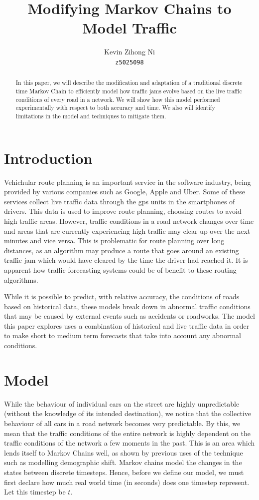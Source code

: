 \documentclass[a4paper]{article}
\title{Modifying Markov Chains to Model Traffic}
\author{Kevin Zihong Ni\\\texttt{z5025098}}
\begin{document}
\maketitle

\begin{abstract}
	In this paper, we will describe the modification and adaptation of a traditional discrete time Markov Chain to efficiently model how 
	traffic jams evolve based on the live traffic conditions of every road in a network.
	We will show how this model performed experimentally with respect to both accuracy and time.
	We also will identify limitations in the model and techniques to mitigate them.
\end{abstract}

\section{Introduction}
Vehichular route planning is an important service in the software industry, being provided by various companies such as Google, Apple and Uber.
Some of these services collect live traffic data through the gps units in the smartphones of drivers.
This data is used to improve route planning, choosing routes to avoid high traffic areas.
However, traffic conditions in a road network changes over time and areas that are currently experiencing high traffic may clear up over the next minutes and vice versa.
This is problematic for route planning over long distances, 
as an algorithm may produce a route that goes around an existing traffic jam which would have cleared by the time the driver had reached it.  
It is apparent how traffic forecasting systems could be of benefit to these routing algorithms.

While it is possible to predict, with relative accuracy, the conditions of roads based on historical data, 
these models break down in abnormal traffic conditions that may be caused by external events such as accidents or roadworks.
The model this paper explores uses a combination of historical and live traffic data in order to make short to medium term forecasts that take into account any 
abnormal conditions. 

\section{Model}
While the behaviour of individual cars on the street are highly unpredictable (without the knowledge of its intended destination), we notice that the collective behaviour 
of all cars in a road network becomes very predictable.
By this, we mean that the traffic conditions of the entire network is highly dependent on the traffic conditions of the network a few moments in the past.
This is an area which lends itself to Markov Chains well, as shown by previous uses of the technique such as modelling demographic shift.
Markov chains model the changes in the states between discrete timesteps. 
Hence, before we define our model, we must first declare how much real world time (in seconds) does one timestep represent. 
Let this timestep be $t$.
\end{document}
